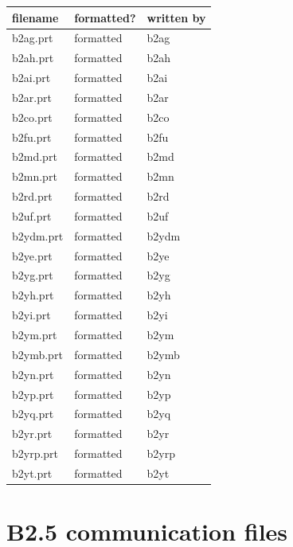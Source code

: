 \documentclass[a4paper,10pt]{report}
\begin{document}
\begin{table}[hbtp]
  \leavevmode
  \begin{center}
\begin{tabular}{l|l|l}
filename & formatted? & written by \\ \hline
b2ag.prt \index{b2ag.prt} & formatted & b2ag \\
b2ah.prt \index{b2ah.prt} & formatted & b2ah \\
b2ai.prt \index{b2ai.prt} & formatted & b2ai \\
b2ar.prt \index{b2ar.prt} & formatted & b2ar \\
b2co.prt \index{b2co.prt} & formatted & b2co \\
b2fu.prt \index{b2fu.prt} & formatted & b2fu \\
b2md.prt \index{b2md.prt} & formatted & b2md \\
b2mn.prt \index{b2mn.prt} & formatted & b2mn \\
b2rd.prt \index{b2rd.prt} & formatted & b2rd \\
b2uf.prt \index{b2uf.prt} & formatted & b2uf \\
b2ydm.prt \index{b2ydm.prt} & formatted & b2ydm \\
b2ye.prt \index{b2ye.prt} & formatted & b2ye \\
b2yg.prt \index{b2yg.prt} & formatted & b2yg \\
b2yh.prt \index{b2yh.prt} & formatted & b2yh \\
b2yi.prt \index{b2yi.prt} & formatted & b2yi \\
b2ym.prt \index{b2ym.prt} & formatted & b2ym \\
b2ymb.prt \index{b2ymb.prt} & formatted & b2ymb \\
b2yn.prt \index{b2yn.prt} & formatted & b2yn \\
b2yp.prt \index{b2yp.prt} & formatted & b2yp \\
b2yq.prt \index{b2yq.prt} & formatted & b2yq \\
b2yr.prt \index{b2yr.prt} & formatted & b2yr \\
b2yrp.prt \index{b2yrp.prt} & formatted & b2yrp \\
b2yt.prt \index{b2yt.prt} & formatted & b2yt \\
\end{tabular}
  \end{center}
\end{table}

\clearpage
\section{B2.5 communication files}
\label{sec:b2files}
\end{document}

